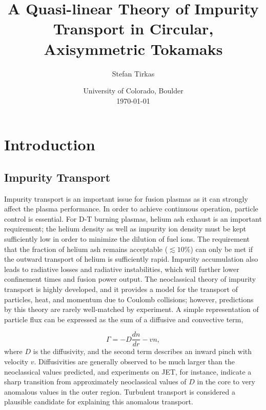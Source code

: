 \documentclass[12pt]{article}
\numberwithin{equation}{subsection}
\begin{document}
\title{A Quasi-linear Theory of Impurity Transport in Circular, Axisymmetric Tokamaks}
\author{Stefan Tirkas}


\date{University of Colorado, Boulder\\[2ex]%
      \today}

\maketitle


\section{Introduction}

\subsection{Impurity Transport}
   \quad Impurity transport is an important issue for fusion plasmas as it can strongly affect the plasma performance.
In order to achieve continuous operation, particle control is essential\cite{ITER}. For D-T burning plasmas, helium ash exhaust is
an important requirement; the helium density as well as impurity ion density must be kept sufficiently low in order to
minimize the dilution of fuel ions. The requirement that the fraction of helium ash remains acceptable ($\lesssim 10\%$) can
only be met if the outward transport of helium is sufficiently rapid\cite{WessonA}. Impurity accumulation also leads to radiative
losses and radiative instabilities, which will further lower confinement times and fusion power output. The neoclassical theory of
impurity transport is highly developed, and it provides a model for the transport of particles, heat, and momentum due to Coulomb
collisions; however, predictions by this theory are rarely well-matched by experiment. A simple representation of particle flux can
be expressed as the sum of a diffusive and convective term,

   \begin{equation}
      \Gamma = -D\frac{dn}{dr} - vn,
   \end{equation}
where $D$ is the diffusivity, and the second term describes an inward pinch with velocity $v$. Diffusivities are generally observed
to be much larger than the neoclassical values predicted, and experiments on JET, for instance, indicate a sharp transition from
approximately neoclassical values of $D$ in the core to very anomalous values in the outer region\cite{WessonB}. Turbulent transport
is considered a plausible candidate for explaining this anomalous transport.
\end{document}
